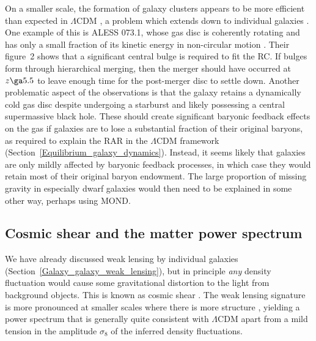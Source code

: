\documentclass[fleqn,usenatbib,useAMS]{mnras} %
\begin{document}
On a smaller scale, the formation of galaxy clusters appears to be more efficient than expected in $\Lambda$CDM \citep{Capak_2011, Cucciati_2018, Champagne_2021, McConachie_2022}, a problem which extends down to individual galaxies \citep{Steinhardt_2016, Marrone_2018, Wang_2019, Rennehan_2020, Neeleman_2020, Tsukui_2021}. One example of this is ALESS 073.1, whose gas disc is coherently rotating and has only a small fraction of its kinetic energy in non-circular motion \citep{Lelli_2021}. Their figure~2 shows that a significant central bulge is required to fit the RC. If bulges form through hierarchical merging, then the merger should have occurred at $z \ga 5.5$ to leave enough time for the post-merger disc to settle down. Another problematic aspect of the observations is that the galaxy retains a dynamically cold gas disc despite undergoing a starburst and likely possessing a central supermassive black hole. These should create significant baryonic feedback effects on the gas if galaxies are to lose a substantial fraction of their original baryons, as required to explain the RAR in the $\Lambda$CDM framework (Section~\ref{Equilibrium_galaxy_dynamics}). Instead, it seems likely that galaxies are only mildly affected by baryonic feedback processes, in which case they would retain most of their original baryon endowment. The large proportion of missing gravity in especially dwarf galaxies would then need to be explained in some other way, perhaps using MOND.



\subsection{Cosmic shear and the matter power spectrum}
\label{Cosmic_shear}

We have already discussed weak lensing by individual galaxies (Section~\ref{Galaxy_galaxy_weak_lensing}), but in principle \emph{any} density fluctuation would cause some gravitational distortion to the light from background objects. This is known as cosmic shear \citep[for a review, see][]{Kilbinger_2015}. The weak lensing signature is more pronounced at smaller scales where there is more structure \citep{DES_2018}, yielding a power spectrum that is generally quite consistent with $\Lambda$CDM apart from a mild tension in the amplitude $\sigma_8$ of the inferred density fluctuations.
\end{document}
